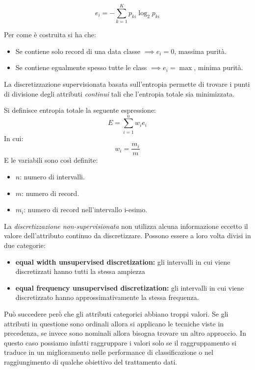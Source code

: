  	\[e_{i} = - \sum_{k = 1}^{K}p_{ki}\log_{2}p_{ki}\]
 	
Per come è costruita si ha che:
\begin{itemize}
	\item Se contiene solo record di una data classe $\implies e_{i} = 0$, massima purità. 
	\item Se contiene egualmente spesso tutte le class $\implies e_{i} = \max$, minima purità. 
\end{itemize}

La discretizzazione supervisionata basata sull'entropia permette di trovare i punti di divisione degli attributi \textit{continui} tali che l'entropia totale sia minimizzata.

\begin{defn}
	Si definisce entropia totale la seguente espressione:
	\[ E = \sum_{i = 1}^{n}w_{i}e_{i}\] 
	In cui:
	\[w_{i} = \frac{m_{i}}{m}\]
	E le variabili sono così definite: \begin{itemize}
		\item $n$: numero di intervalli.
		\item $m$: numero di record.
		\item $m_{i}$: numero di record nell'intervallo i-esimo.
	\end{itemize}
\end{defn}


 	
La \textit{discretizzazione non-supervisionata} non utilizza alcuna informazione eccetto il valore dell'attributo continuo da discretizzare. Possono essere a loro volta divisi in due categorie:
 	\begin{itemize}
 		\item \textbf{equal width unsupervised discretization:}  gli intervalli in cui viene discretizzati hanno tutti la stessa ampiezza
 		\item  \textbf{equal frequency unsupervised discretization:} gli intervalli in cui viene discretizzato hanno approssimativamente la stessa frequenza.
 	\end{itemize}
 
 
 Può succedere però che gli attributi categorici abbiano troppi valori. Se gli attributi  in questione sono ordinali allora si applicano le tecniche viste in precedenza, se invece sono nominali allora bisogna trovare un altro approccio. In questo caso possiamo infatti raggruppare i valori solo se il raggruppamento si traduce in un miglioramento nelle performance di classificazione o nel raggiungimento di qualche obiettivo del trattamento dati. 
